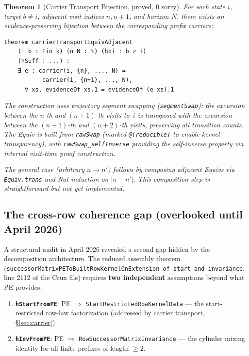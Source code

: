 \documentclass[11pt]{article}
\newtheorem{theorem}{Theorem}[section]
\theoremstyle{definition}
\newcommand{\lean}[1]{\texttt{#1}}
\begin{document}
\begin{theorem}[Carrier Transport Bijection, {\color{provedgreen}proved, 0 sorry}]
\label{thm:carrier}
For each state $i$, target $b \ne i$, adjacent visit indices $n, n+1$,
and horizon $N$, there exists an evidence-preserving bijection between
the corresponding prefix carriers:
\begin{lstlisting}
theorem carrierTransportEquivAdjacent
    (i b : Fin k) (n N : ℕ) (hbi : b ≠ i)
    (hSuff : ...) :
    ∃ e : carrier(i, {n}, ..., N) ≃
           carrier(i, {n+1}, ..., N),
      ∀ xs, evidenceOf xs.1 = evidenceOf (e xs).1
\end{lstlisting}

The construction uses trajectory segment swapping
(\lean{segmentSwap}): the excursion between the $n$-th and $(n+1)$-th
visits to~$i$ is transposed with the excursion between the $(n+1)$-th
and $(n+2)$-th visits, preserving all transition counts.  The Equiv
is built from \lean{rawSwap} (marked \lean{@[reducible]} to enable
kernel transparency), with \lean{rawSwap\_selfInverse} providing
the self-inverse property via internal visit-time proof construction.

The general case (arbitrary $n \to n'$) follows by composing
adjacent Equivs via \lean{Equiv.trans} and Nat induction on $|n - n'|$.
This composition step is straightforward but not yet implemented.
\end{theorem}

\subsection{The cross-row coherence gap (overlooked until April 2026)}
\label{sec:crossrow}

A structural audit in April 2026 revealed a second gap hidden by the
decomposition architecture.  The reduced assembly theorem
(\lean{successorMatrixPEToBuiltRowKernelOnExtension\_of\_start\_and\_invariance},
line 2112 of the Crux file) requires \textbf{two independent} assumptions
beyond what PE provides:

\begin{enumerate}[leftmargin=2em]
\item \textbf{\lean{hStartFromPE}}: PE $\Rightarrow$
  \lean{StartRestrictedRowKernelData} --- the start-restricted row-law
  factorization (addressed by carrier transport, \S\ref{sec:carrier}).
\item \textbf{\lean{hInvFromPE}}: PE $\Rightarrow$
  \lean{RowSuccessorMatrixInvariance} --- the cylinder mixing identity
  for all finite prefixes of length $\ge 2$.
\end{enumerate}
\end{document}

